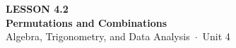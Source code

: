 \documentclass[aspectratio=169, 11pt]{beamer}
\begin{document}
{
\begin{frame}[plain]
  \vspace{2.8cm}\hspace{0.55cm}%
  \begin{minipage}{0.9\textwidth}
    {\color{goldacc}\bfseries\small LESSON 4.2}\\[0.5cm]
    {\color{white}\bfseries\LARGE Permutations and Combinations}\\[1.2cm]
    {\color{mistmid}\small Algebra, Trigonometry, and Data Analysis~$\cdot$~Unit 4}
  \end{minipage}
\end{frame}
}

\begin{frame}[t, plain]
\end{frame}
\end{document}
